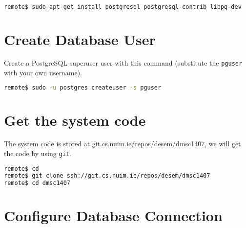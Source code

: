 \begin{minipage}{\linewidth}
\begin{lstlisting}[language=bash]
remote$ sudo apt-get install postgresql postgresql-contrib libpq-dev
\end{lstlisting}
\end{minipage}

\section{Create Database User}

Create a PostgreSQL superuser user with this command
(substitute the \texttt{pguser} with your own username).

\begin{minipage}{\linewidth}
\begin{lstlisting}[language=bash]
remote$ sudo -u postgres createuser -s pguser
\end{lstlisting}
\end{minipage}

\section{Get the system code}

The system code is stored at \url{git.cs.nuim.ie/repos/desem/dmsc1407},
we will get the code by using \texttt{git}.

\begin{minipage}{\linewidth}
\begin{lstlisting}[language=bash]
remote$ cd
remote$ git clone ssh://git.cs.nuim.ie/repos/desem/dmsc1407
remote$ cd dmsc1407
\end{lstlisting}
\end{minipage}

\section{Configure Database Connection}
